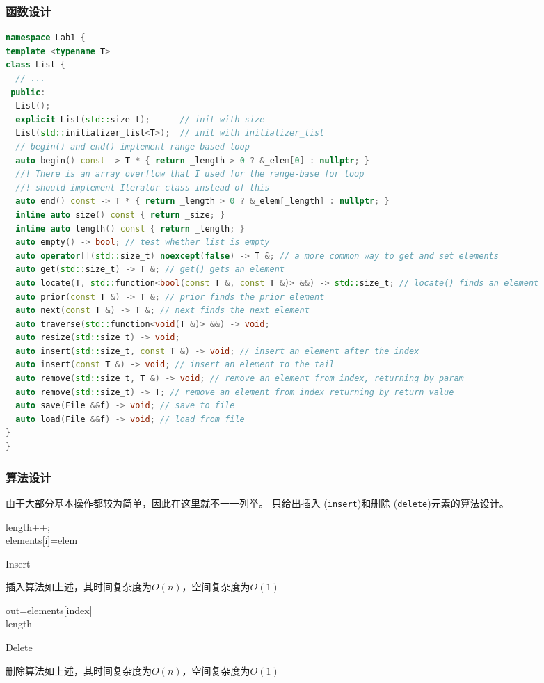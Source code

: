 \documentclass[format=draft,language=chinese,category=academic-report]{hustreport}
\begin{document}
\subsubsection{函数设计}
\begin{lstlisting}[language=c++]
namespace Lab1 {
template <typename T>
class List {
  // ...
 public:
  List();
  explicit List(std::size_t);      // init with size
  List(std::initializer_list<T>);  // init with initializer_list
  // begin() and end() implement range-based loop
  auto begin() const -> T * { return _length > 0 ? &_elem[0] : nullptr; }
  //! There is an array overflow that I used for the range-base for loop
  //! should implement Iterator class instead of this
  auto end() const -> T * { return _length > 0 ? &_elem[_length] : nullptr; }
  inline auto size() const { return _size; }
  inline auto length() const { return _length; }
  auto empty() -> bool; // test whether list is empty
  auto operator[](std::size_t) noexcept(false) -> T &; // a more common way to get and set elements
  auto get(std::size_t) -> T &; // get() gets an element
  auto locate(T, std::function<bool(const T &, const T &)> &&) -> std::size_t; // locate() finds an element
  auto prior(const T &) -> T &; // prior finds the prior element
  auto next(const T &) -> T &; // next finds the next element
  auto traverse(std::function<void(T &)> &&) -> void;
  auto resize(std::size_t) -> void;
  auto insert(std::size_t, const T &) -> void; // insert an element after the index
  auto insert(const T &) -> void; // insert an element to the tail
  auto remove(std::size_t, T &) -> void; // remove an element from index, returning by param
  auto remove(std::size_t) -> T; // remove an element from index returning by return value
  auto save(File &&f) -> void; // save to file
  auto load(File &&f) -> void; // load from file
}
}
\end{lstlisting}
\subsubsection{算法设计}
由于大部分基本操作都较为简单，因此在这里就不一一列举。
只给出插入 (\texttt{insert})和删除 (\texttt{delete})元素的算法设计。
\newline
\begin{algorithm}[H]
    \SetAlgoLined
    length++;
    \\
    elements[i]=elem
\caption{Insert}\label{alg:insert}
\end{algorithm}
插入算法如上述，其时间复杂度为$O(n)$，空间复杂度为$O(1)$
\begin{algorithm}
    \SetAlgoLined
    out=elements[index]
    \\
    length--
\caption{Delete}\label{alg:delete}
\end{algorithm}
\newline
删除算法如上述，其时间复杂度为$O(n)$，空间复杂度为$O(1)$
\end{document}
